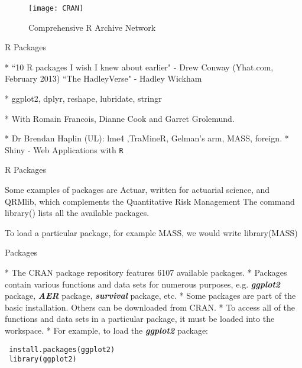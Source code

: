 
 \begin{figure}
 \centering
 \texttt{[image: CRAN]}
 \caption{Comprehensive R Archive Network}
 
 \end{figure}
 
  
 
{R Packages}
 
 
 *  ``10 R packages I wish I knew about earlier" - Drew Conway (Yhat.com, February 2013)
 \bigskip *  ``The HadleyVerse" - Hadley Wickham
 
 
 *   ggplot2, dplyr, reshape, lubridate, stringr
 
 *   With Romain Francois, Dianne Cook and Garret Grolemund.

 \bigskip
 *  Dr Brendan Haplin (UL): lme4 ,TraMineR, Gelman's arm, MASS, foreign. 
 \bigskip
 *  Shiny - Web Applications with \texttt{R}

 
 
{R Packages}
 
 
 
 
 Some examples of packages are Actuar, written for actuarial science, and
 QRMlib, which complements the Quantitative Risk Management The command library()
 lists all the available packages. 
 
 To load a particular package, for example MASS, we would
 write
 library(MASS)
 
 
 
 
{Packages}
 
 *  The CRAN package repository features 6107 available packages. 
 *  Packages contain
 various functions and data sets for numerous purposes, e.g.
 \textbf{\textit{ggplot2}} package, \textbf{\textit{AER}} package, \textbf{\textit{survival}} package, etc.
 *  Some packages are part of the basic installation. Others can be
 downloaded from CRAN.
 *  To access all of the functions and data sets in a particular package,
 it must be loaded into the workspace. 
 *  For example, to load the
 \textbf{\textit{ggplot2}} package:

 \begin{framed}
 \begin{verbatim}
 install.packages(ggplot2)
 library(ggplot2)
 \end{verbatim}
 \end{framed}
 
